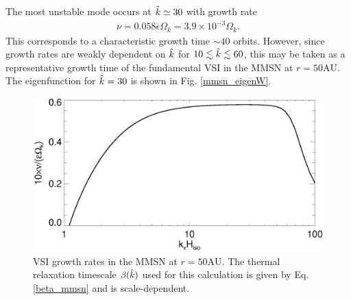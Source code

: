 The most unstable mode occurs at $\hat{k}\simeq30$ with growth rate 
\begin{align*}
  \nu =0.058\epsilon\Omega_k = 3.9\times10^{-3}\Omega_k.  
\end{align*}
This corresponds to a characteristic growth time $\sim
40$ orbits. However, since growth rates are weakly dependent on $\hat{k}$ for
$10\lesssim \hat{k} \lesssim 60$, this may be taken as a representative growth
time of the fundamental VSI in the MMSN at $r=50\mathrm{AU}$. The
eigenfunction for $\hat{k}=30$ is shown in Fig. \ref{mmsn_eigenW}. 

\begin{figure}
  \includegraphics[width=\linewidth,clip=true,trim=0cm 0cm 0cm
  0cm]{figures/growth_mmsn_50AU} 
  \caption{VSI growth rates in the MMSN at
    $r=50\mathrm{AU}$. The thermal relaxation timescale $\beta(\hat{k})$
    used for this calculation is given by
    Eq. \ref{beta_mmsn} and is scale-dependent. 
    \label{mmsn_growth}}  
\end{figure}


